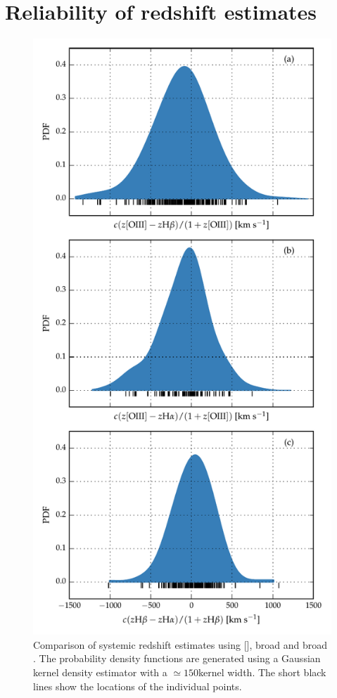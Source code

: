 \section{Reliability of redshift estimates}

\begin{figure}
    \centering
    \includegraphics[width=0.8\linewidth]{figures/chapter04/redshift_comparison.pdf} 
    \caption[{Comparison of systemic redshift estimates using [], broad \hb and broad \hans.}]{Comparison of systemic redshift estimates using [], broad \hb and broad \hans. The probability density functions are generated using a Gaussian kernel density estimator with a $\simeq150$\kms kernel width. The short black lines show the locations of the individual points.}       
    \label{fig:redshift_comparison}
\end{figure}

